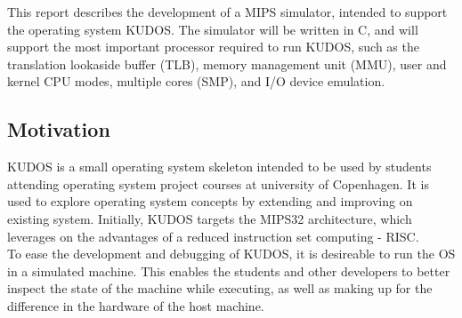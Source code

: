 This report describes the development of a MIPS simulator, intended to support
the operating system KUDOS. The simulator will be written in C, and will
support the most important processor required to run KUDOS, such as the
translation lookaside
buffer (TLB), memory management unit (MMU), user and kernel CPU modes,
multiple cores (SMP), and I/O device emulation. \\


\subsection{Motivation}
KUDOS is a small operating system skeleton intended to be used by students
attending operating system project courses at university of Copenhagen.
It is used to explore operating system concepts by extending and improving on
existing system.
Initially, KUDOS targets the MIPS32 architecture, which leverages on the
advantages of a
reduced instruction set computing - RISC.\\
To ease the development and debugging of KUDOS, it is desireable to run the OS
in a simulated machine. This enables the students and other developers to
better inspect the state of the machine while executing, as well as making up
for the difference in the hardware of the host machine.

